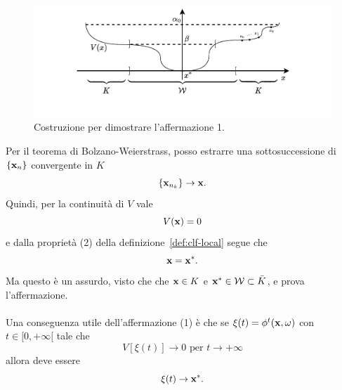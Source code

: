 \begin{steps}
    \hfill
    \begin{minipage}{.8\textwidth}
        \begin{figure}[H]
            \centering
            \includegraphics[width=\textwidth]{assets/ljapunov-dim-aff1}
            \caption[Costruzione 1 per teorema di Ljapunov]{Costruzione per dimostrare
            l'affermazione 1.}
            \label{fig:ljapunov-dim-aff1}
        \end{figure}
    \end{minipage}

    Per il teorema di Bolzano-Weierstrass, posso estrarre una
    sottosuccessione di $\{\mathbf{x}_n\}$ convergente in $K$
    \begin{equation*}
    \{\mathbf{x}_ {n_k}\} \to \mathbf{x}.
    \end{equation*}
    Quindi, per la continuità di $V$ vale
    \begin{equation*}
        V(\mathbf{x}) = 0
    \end{equation*}
    e dalla proprietà (2) della definizione~\ref{def:clf-local}
    segue che
    \begin{equation*}
        \mathbf{x} = \mathbf{x}^*.
    \end{equation*}
    Ma questo è un assurdo, visto che che $\mathbf{x} \in K$
    e $\mathbf{x}^* \in \mathcal W \subset \bar K$, e prova l'affermazione.

    \hfill\openbox\paragraph{}

    Una conseguenza utile dell'affermazione (1) è che se
    $\xi(t) = \phi^t(\mathbf{x}, \omega)$ con $t \in [0, +\infty[$ tale che
    \begin{equation*}
        V[\xi(t)] \to 0 \text{ per } t \to +\infty
    \end{equation*}
    allora deve essere
    \begin{equation}
        \xi(t) \to \mathbf{x}^*.
        \label{eq:xi-to-xstar}
    \end{equation}



\end{steps}
